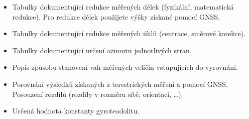 \begin{itemize}
    \item Tabulky dokumentující redukce měřených délek (fyzikální, matematická redukce). 
          Pro redukce délek použijete výšky získané pomocí GNSS.
    \item Tabulky dokumentující redukce měřených úhlů (centrace, směrové korekce).
    \item Tabulky dokumentující určení azimutu jednotlivých stran.
    \item Popis způsobu stanovení vah měřených veličin vstupujících do vyrovnání.
    
    \item Porovnání výsledků získaných z terestrických měření a pomocí GNSS. 
          Posouzení rozdílů (rozdíly v rozměru sítě, orientaci, \ldots).
    
    \item Určená hodnota konstanty gyroteodolitu.
\end{itemize}